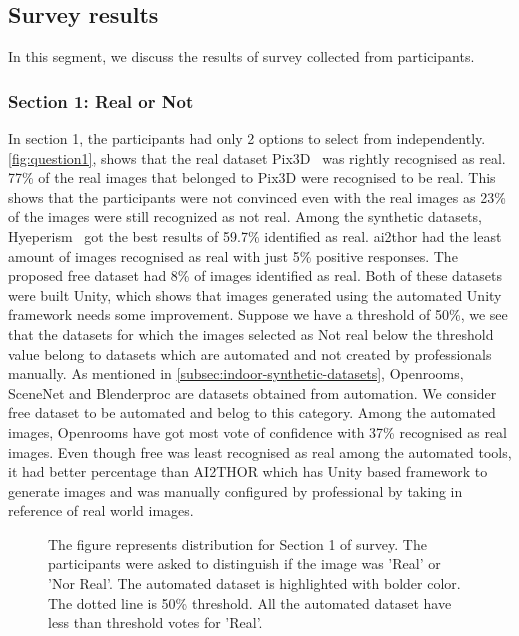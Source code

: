\subsection{Survey results}\label{subsec:survey-results}
In this segment, we discuss the results of survey collected from participants.

\subsubsection{Section 1: Real or Not}
In section 1, the participants had only 2 options to select from independently.
\autoref{fig:question1}, shows that the real dataset Pix3D~\cite{pix3d} was rightly recognised as real.
77\% of the real images that belonged to Pix3D were recognised to be real.
This shows that the participants were not convinced even with the real images as 23\% of the images were still recognized as not real.
Among the synthetic datasets, Hyeperism~\cite{Roberts2020HypersimAP} got the best results of 59.7\% identified as real.
\gls{ai2thor} had the least amount of images recognised as real with just 5\% positive responses.
The proposed \gls{free} dataset had 8\% of images identified as real.
Both of these datasets were built Unity, which shows that images generated using the automated Unity framework needs some improvement.
Suppose we have a threshold of 50\%, we see that the datasets for which the images selected as Not real below the threshold value belong to datasets which are automated and not created by professionals manually.
As mentioned in \autoref{subsec:indoor-synthetic-datasets}, Openrooms, SceneNet and Blenderproc are datasets obtained from automation.
We consider \gls{free} dataset to be automated and belog to this category.
Among the automated images, Openrooms have got most vote of confidence with 37\% recognised as real images.
Even though \gls{free} was least recognised as real among the automated tools, it had better percentage than AI2THOR
which has Unity based framework to generate images and was manually configured by professional by taking in reference of real world images.

\begin{figure}
    \centering
    \resizebox{\textwidth}{!}{}
    \caption{The figure represents distribution for Section 1 of survey. The participants were asked to distinguish if the image was 'Real' or 'Nor Real'.
    The automated dataset is highlighted with bolder color. The dotted line is 50\% threshold. All the automated dataset have less than threshold votes for 'Real'.}
    \label{fig:question1}
\end{figure}

